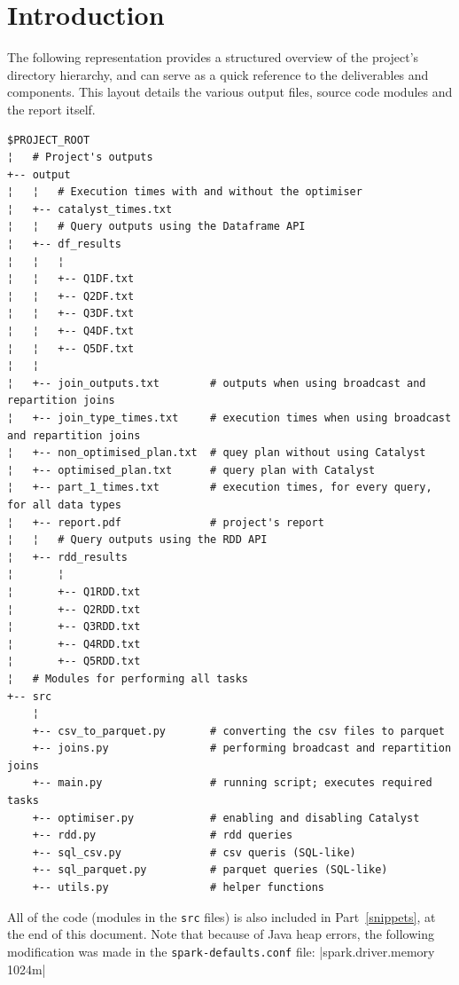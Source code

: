 \documentclass[12pt,twoside]{article}
\begin{document}



\section*{Introduction}

The following representation provides a structured overview of the project's directory hierarchy, and can serve as a quick reference to the deliverables and components. This layout details the various output files, source code modules and the report itself.

\begin{verbatim}
$PROJECT_ROOT
¦   # Project's outputs
+-- output
¦   ¦   # Execution times with and without the optimiser
¦   +-- catalyst_times.txt
¦   ¦   # Query outputs using the Dataframe API
¦   +-- df_results
¦   ¦   ¦
¦   ¦   +-- Q1DF.txt
¦   ¦   +-- Q2DF.txt
¦   ¦   +-- Q3DF.txt
¦   ¦   +-- Q4DF.txt
¦   ¦   +-- Q5DF.txt
¦   ¦
¦   +-- join_outputs.txt        # outputs when using broadcast and repartition joins
¦   +-- join_type_times.txt     # execution times when using broadcast and repartition joins
¦   +-- non_optimised_plan.txt  # quey plan without using Catalyst
¦   +-- optimised_plan.txt      # query plan with Catalyst
¦   +-- part_1_times.txt        # execution times, for every query, for all data types
¦   +-- report.pdf              # project's report
¦   ¦   # Query outputs using the RDD API
¦   +-- rdd_results
¦       ¦
¦       +-- Q1RDD.txt
¦       +-- Q2RDD.txt
¦       +-- Q3RDD.txt
¦       +-- Q4RDD.txt
¦       +-- Q5RDD.txt
¦   # Modules for performing all tasks
+-- src
    ¦
    +-- csv_to_parquet.py       # converting the csv files to parquet
    +-- joins.py                # performing broadcast and repartition joins
    +-- main.py                 # running script; executes required tasks
    +-- optimiser.py            # enabling and disabling Catalyst
    +-- rdd.py                  # rdd queries
    +-- sql_csv.py              # csv queris (SQL-like)
    +-- sql_parquet.py          # parquet queries (SQL-like)
    +-- utils.py                # helper functions
\end{verbatim}

All of the code (modules in the \texttt{src} files) is also included in Part~\ref{snippets}, at the end of this document. Note that because of Java heap errors, the following modification was made in the \texttt{spark-defaults.conf} file:
|spark.driver.memory 1024m|
\end{document}
